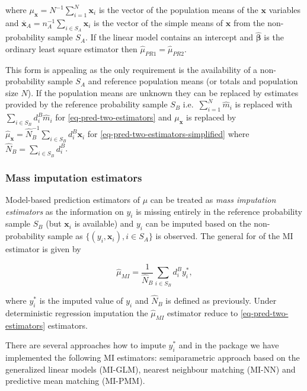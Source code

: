 \documentclass[
]{jss}
\begin{document}
where \(\mu_{\boldsymbol{x}} = N^{-1}\sum_{i=1}^N\boldsymbol{x}_i\) is
the vector of the population means of the \(\boldsymbol{x}\) variables
and
\(\overline{\boldsymbol{x}}_A=n_A^{-1}\sum_{i \in S_A}\boldsymbol{x}_i\)
is the vector of the simple means of \(\boldsymbol{x}\) from the
non-probability sample \(S_A\). If the linear model contains an
intercept and \(\hat{\boldsymbol{\beta}}\) is the ordinary least square
estimator then \(\hat{\mu}_{PR1}=\hat{\mu}_{PR2}\).

This form is appealing as the only requirement is the availability of a
non-probability sample \(S_A\) and reference population means (or totals
and population size \(N\)). If the population means are unknown they can
be replaced by estimates provided by the reference probability sample
\(S_B\) i.e.~\(\sum_{i=1}^N \hat{m}_i\) is replaced with
\(\sum_{i \in S_B} d_i^B\hat{m}_i\) for \eqref{eq-pred-two-estimators}
and \(\mu_{\boldsymbol{x}}\) is replaced by
\(\hat{\mu}_{\boldsymbol{x}}=\hat{N}_B^{-1}\sum_{i \in S_B}d_i^B\boldsymbol{x}_i\)
for \eqref{eq-pred-two-estimators-simplified} where
\(\hat{N}_B=\sum_{i \in S_B}d_i^B\).

\subsubsection{Mass imputation
estimators}\label{mass-imputation-estimators}

Model-based prediction estimators of \(\mu\) can be treated as
\textit{mass imputation estimators} as the information on \(y_i\) is
missing entirely in the reference probability sample \(S_B\) (but
\(\boldsymbol{x}_i\) is available) and \(y_i\) can be imputed based on
the non-probability sample as
\(\{ (y_i, \boldsymbol{x}_i), i \in S_A\}\) is observed. The general for
of the MI estimator is given by

\begin{equation}
\hat{\mu}_{MI}=\frac{1}{\hat{N}_{B}} \sum_{i \in S_{B}} d_i^{B} y_i^*, 
\end{equation}

where \(y_i^*\) is the imputed value of \(y_i\) and \(\hat{N}_{B}\) is
defined as previously. Under deterministic regression imputation the
\(\hat{\mu}_{MI}\) estimator reduce to \eqref{eq-pred-two-estimators}
estimators.

There are several approaches how to impute \(y_i^*\) and in the package
we have implemented the following MI estimators: semiparametric approach
based on the generalized linear models (MI-GLM), nearest neighbour
matching (MI-NN) and predictive mean matching (MI-PMM).
\end{document}
